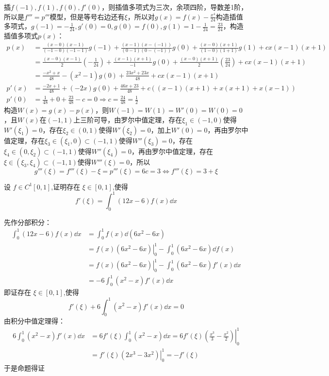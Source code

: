\begin{solution}
    插$f(-1),f(1),f(0),f'(0)$，则插值多项式为三次，余项四阶，导数差1阶，所以是$f'''=p'''$模型，但是等号右边还有$\xi$，所以对$g(x)=f(x)-\frac{x^4}{24}$构造插值多项式，$g(-1)=-\frac{1}{24},g'(0)=0,g(0)=f(0),g(1)=1-\frac{1}{24}=\frac{23}{24}$，构造插值多项式$p(x)$：
    \begin{align*}
        p(x)&=\frac{(x-0)(x-1)}{(-1-0)(-1-1)}g(-1)+\frac{(x-1)(x-(-1))}{(0-1)(0-(-1))}g(0)+\frac{(x-0)(x+1)}{(1-0)(1+1)}g(1)+cx(x-1)(x+1)\\
        &=\frac{(x-0)(x-1)}{2}\left(-\frac{1}{24}\right)+\frac{(x-1)(x+1)}{-1}g(0)+\frac{(x-0)(x+1)}{2}\left(\frac{23}{24}\right)+cx(x-1)(x+1)\\
        &=\frac{-x^2+x}{48}-(x^2-1)g(0)+\frac{23x^2+23x}{48}+cx(x-1)(x+1)\\
        p'(x)&=\frac{-2x+1}{48}+(-2x)g(0)+\frac{46x+23}{48}+c\left((x-1)(x+1)+x(x+1)+x(x-1)\right)\\
        p'(0)&=\frac{1}{48}+0+\frac{23}{48}-c=0\Rightarrow c=\frac{24}{48}=\frac12
    \end{align*}
    构造$W(x)=g(x)-p(x)$，则$W(-1)=W(1)=W'(0)=W(0)=0$，且$W(x)$在$(-1,1)$上三阶可导，由罗尔中值定理，存在$\xi_1\in(-1,0)$使得$W'(\xi_1)=0$，存在$\xi_2\in(0,1)$使得$W'(\xi_2)=0$，加上$W'(0)=0$，再由罗尔中值定理，存在$\xi_3\in(\xi_1,0)\subset(-1,1)$使得$W''(\xi_3)=0$，存在$\xi_4\in(0,\xi_2)\subset(-1,1)$使得$W''(\xi_4)=0$，再由罗尔中值定理，存在$\xi\in(\xi_3,\xi_4)\subset(-1,1)$使得$W'''(\xi)=0$，所以\[g'''(\xi)=f'''(\xi)-\xi=p'''(\xi)=6c=3\Leftrightarrow f'''(\xi)=3+\xi\]
\end{solution}
\newpage
\begin{example}[$f'\left(\xi\right)=\int_0^1\left(12x-6\right)f\left(x\right)\dd x$]
设 $f\in C^1[0,1]$,证明存在 $\xi\in[0,1]$,使得$$f'\left(\xi\right)=\int_0^1\left(12x-6\right)f\left(x\right)\dd x$$
\end{example}
\begin{solution}
先作分部积分：
\begin{align*}
    \int_0^1\left(12x-6\right)f\left(x\right)\dd x&=\int_0^1 f(x)\dd(6x^2-6x)\\
    &=\left.f(x)(6x^2-6x)\right|_0^1-\int_0^1 (6x^2-6x)\dd f(x)\\
    &=\left.f(x)(6x^2-6x)\right|_0^1-\int_0^1 (6x^2-6x)f'(x)\dd x\\
    &=-6\int_0^1 (x^2-x)f'(x)\dd x
\end{align*}
即证存在 $\xi\in[0,1]$,使得\[f'(\xi)+6\int_0^1 (x^2-x)f'(x)\dd x=0\]
由积分中值定理得：
\begin{align*}
    6\int_0^1 (x^2-x)f'(x)\dd x&=6f'(\xi)\int_0^1(x^2-x)\dd x=6f'(\xi)\left.\left(\frac{x^3}{3}-\frac{x^2}{2}\right)\right|_0^1\\
    &=f'(\xi)\left.\left(2x^3-3x^2\right)\right|_0^1=-f'(\xi)
\end{align*}
于是命题得证
\end{solution}



